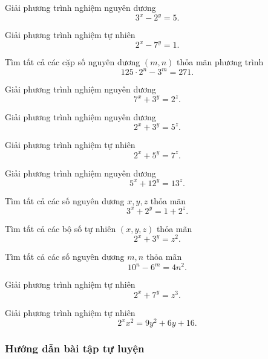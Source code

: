 \begin{btt}
Giải phương trình nghiệm nguyên dương $$3^x-2^y=5.$$
\end{btt}

\begin{btt}
Giải phương trình nghiệm tự nhiên $$2^x-7^y=1.$$
\end{btt}

\begin{btt}
Tìm tất cả các cặp số nguyên dương $\left ( m,n \right )$ thỏa mãn phương trình
\[125\cdot 2^n-3^m=271.\]
\end{btt}

\begin{btt}
Giải phương trình nghiệm nguyên dương $$7^x+3^y=2^z.$$
\end{btt}

\begin{btt}
Giải phương trình nghiệm nguyên dương $$2^x+3^y=5^z.$$
\end{btt}

\begin{btt}
Giải phương trình nghiệm tự nhiên $$2^x+5^y=7^z.$$
\end{btt}

\begin{btt}
Giải phương trình nghiệm nguyên dương $$5^x+12^y=13^z.$$
\end{btt}

\begin{btt}
Tìm tất cả các số nguyên dương $x,y,z$ thỏa mãn $$3^x+2^y=1+2^z.$$
\end{btt}

\begin{btt}
Tìm tất cả các bộ số tự nhiên $(x,y,z)$ thỏa mãn $$2^x+3^y=z^2.$$
\end{btt}

\begin{btt}
Tìm tất cả các số nguyên dương $m,n$ thỏa mãn
\[10^n-6^m=4n^2.\]
\end{btt}

\begin{btt}
Giải phương trình nghiệm tự nhiên $$2^x+7^y=z^3.$$
\end{btt}

\begin{btt}
Giải phương trình nghiệm tự nhiên $$2^xx^2=9y^2+6 y+16.$$
\end{btt}


\subsubsection*{Hướng dẫn bài tập tự luyện}

